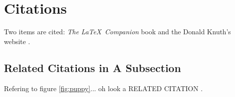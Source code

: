 \documentclass[a4paper, 12pt, notitlepage]{report}
\begin{document}
\section{Citations}
Two items are cited: \textit{The \LaTeX\ Companion} book \cite{latexcompanion} and the Donald Knuth's website \cite{knuthwebsite}. 

\subsection{Related Citations in A Subsection}
Refering to figure \ref{fig:puppy}... oh look a RELATED CITATION \cite{latexcompanion,knuthwebsite}. 

\printbibliography
\end{document}
